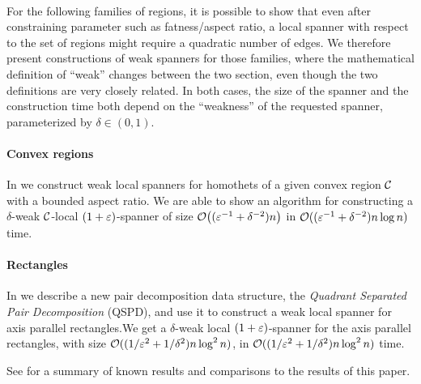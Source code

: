 \documentclass[12pt]{article}%
\begin{document}
\paragraph{}
For the following families of regions, it is possible to show that
even after constraining parameter such as fatness/aspect ratio, a
local spanner with respect to the set of regions might require a
quadratic number of edges. We therefore present constructions of weak
spanners for those families, where the mathematical definition of
``weak'' changes between the two section, even though the two
definitions are very closely related. In both cases, the size of the
spanner and the construction time both depend on the ``weakness'' of
the requested spanner, parameterized by $\delta\in (0,1)$.

\paragraph{Convex regions}
In  we construct weak local spanners for
homothets of a given convex region $\mathcal{C}$ with a bounded aspect
ratio. We are able to show an algorithm for constructing a
$\delta$-weak $\mathcal{C}$-local $(1+\varepsilon)$-spanner of size
$\mathcal{O}\bigl( (\varepsilon^{-1} + \delta^{-2}) n \bigr) $ in
$\mathcal{O}( (\varepsilon^{-1} + \delta^{-2}) n \log n)$ time.


\paragraph{Rectangles}
In  we describe a new pair decomposition data
structure, the \emph{Quadrant Separated Pair Decomposition} (QSPD),
and use it to construct a weak local spanner for axis parallel
rectangles.We get a $\delta$-weak local $(1+\varepsilon)$-spanner for the
axis parallel rectangles, with size
$\mathcal{O}((1/\varepsilon^2 + 1/\delta^2) n \log^2 n)$, in
$\mathcal{O}((1/\varepsilon^2 + 1/\delta^2) n \log^2 n)$ time.

See  for a summary of known results and
comparisons to the results of this paper.
\end{document}
